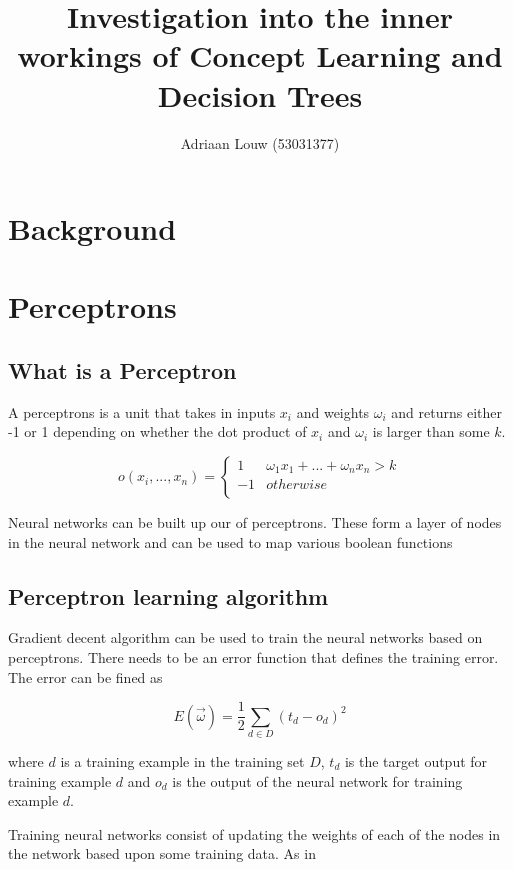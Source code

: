 \documentclass[10pt,a4paper]{article}
\title{Investigation into the inner workings of Concept Learning and Decision Trees}
\author{ Adriaan Louw (53031377)}
\begin{document}
\maketitle

\tableofcontents

\section{Background}

\section{Perceptrons}
\subsection{What is a Perceptron}
A perceptrons is a unit that takes in inputs $x_i$ and weights $\omega_i$ and returns either -1 or 1 depending on whether the dot product of $x_i$ and $\omega_i$ is larger than some $k$.  

\begin{equation}
\label{percept}
o(x_i,...,x_n) =
\begin{cases}
 1 & \omega_1x_1 + ... + \omega_nx_n > k \\
-1 & otherwise \\ 
\end{cases}
\end{equation}

Neural networks can be built up our of perceptrons. These form a layer of nodes in the neural network and can be used to map various boolean functions

\subsection{Perceptron learning algorithm}
Gradient decent algorithm can be used to train the neural networks based on perceptrons. There needs to be an error function that defines the training error. The error can be fined as  

\begin{equation}
E(\vec{\omega}) = \frac{1}{2}\sum_{d \in D} (t_d-o_d)^2
\end{equation}

where $d$ is a training example in the training set $D$, $t_d$ is the target output for training example $d$ and $o_d$ is the output of the neural network for training example $d$.
 
Training neural networks consist of updating the weights of each of the nodes in the network based upon some training data. As in 
\end{document}

